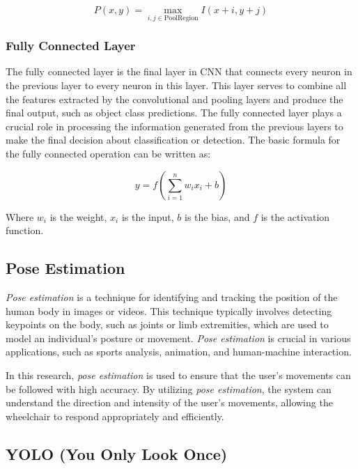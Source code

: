 \begin{equation}
  P(x, y) = \max_{i,j \in \mathrm{PoolRegion}} I(x+i, y+j)
\end{equation}

\subsubsection{Fully Connected Layer}
\label{subsubsec:Fully Connected Layer}

The fully connected layer is the final layer in CNN that connects every neuron in the previous layer to every neuron in this layer. This layer serves to combine all the features extracted by the convolutional and pooling layers and produce the final output, such as object class predictions. The fully connected layer plays a crucial role in processing the information generated from the previous layers to make the final decision about classification or detection. The basic formula for the fully connected operation can be written as:

\begin{equation}
  y = f\left(\sum_{i=1}^{n} w_i x_i + b\right)
\end{equation}

Where \( w_i \) is the weight, \( x_i \) is the input, \( b \) is the bias, and \( f \) is the activation function.

\subsection{Pose Estimation}
\label{subsec:Pose Estimation}

\emph{Pose estimation} is a technique for identifying and tracking the position of the human body in images or videos. This technique typically involves detecting keypoints on the body, such as joints or limb extremities, which are used to model an individual's posture or movement. \emph{Pose estimation} is crucial in various applications, such as sports analysis, animation, and human-machine interaction.

In this research, \emph{pose estimation} is used to ensure that the user's movements can be followed with high accuracy. By utilizing \emph{pose estimation}, the system can understand the direction and intensity of the user's movements, allowing the wheelchair to respond appropriately and efficiently.

\subsection{YOLO (You Only Look Once)}
\label{subsec:YOLO}

